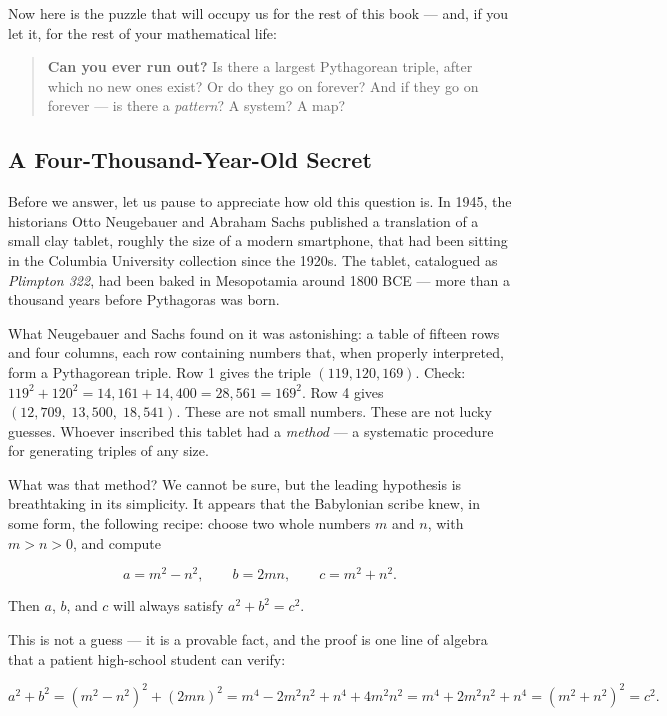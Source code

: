 \documentclass[11pt,twoside,openright]{book}
\theoremstyle{definition}
\theoremstyle{remark}
\begin{document}
Now here is the puzzle that will occupy us for the rest of this book --- and, if you let it, for the rest of your mathematical life:

\begin{quote}
\textbf{Can you ever run out?} Is there a largest Pythagorean triple, after which no new ones exist? Or do they go on forever? And if they go on forever --- is there a \textit{pattern}? A system? A map?
\end{quote}

\subsection{A Four-Thousand-Year-Old Secret}

Before we answer, let us pause to appreciate how old this question is. In 1945, the historians Otto Neugebauer and Abraham Sachs published a translation of a small clay tablet, roughly the size of a modern smartphone, that had been sitting in the Columbia University collection since the 1920s. The tablet, catalogued as \textit{Plimpton 322}, had been baked in Mesopotamia around 1800 BCE --- more than a thousand years before Pythagoras was born.

What Neugebauer and Sachs found on it was astonishing: a table of fifteen rows and four columns, each row containing numbers that, when properly interpreted, form a Pythagorean triple. Row 1 gives the triple $(119, 120, 169)$. Check: $119^2 + 120^2 = 14{,}161 + 14{,}400 = 28{,}561 = 169^2$. Row 4 gives $(12{,}709,\; 13{,}500,\; 18{,}541)$. These are not small numbers. These are not lucky guesses. Whoever inscribed this tablet had a \textit{method} --- a systematic procedure for generating triples of any size.

What was that method? We cannot be sure, but the leading hypothesis is breathtaking in its simplicity. It appears that the Babylonian scribe knew, in some form, the following recipe: choose two whole numbers $m$ and $n$, with $m > n > 0$, and compute

\[a = m^2 - n^2, \qquad b = 2mn, \qquad c = m^2 + n^2.\]

Then $a$, $b$, and $c$ will always satisfy $a^2 + b^2 = c^2$.

This is not a guess --- it is a provable fact, and the proof is one line of algebra that a patient high-school student can verify:

\[a^2 + b^2 = (m^2 - n^2)^2 + (2mn)^2 = m^4 - 2m^2 n^2 + n^4 + 4m^2 n^2 = m^4 + 2m^2 n^2 + n^4 = (m^2 + n^2)^2 = c^2.\]
\end{document}

